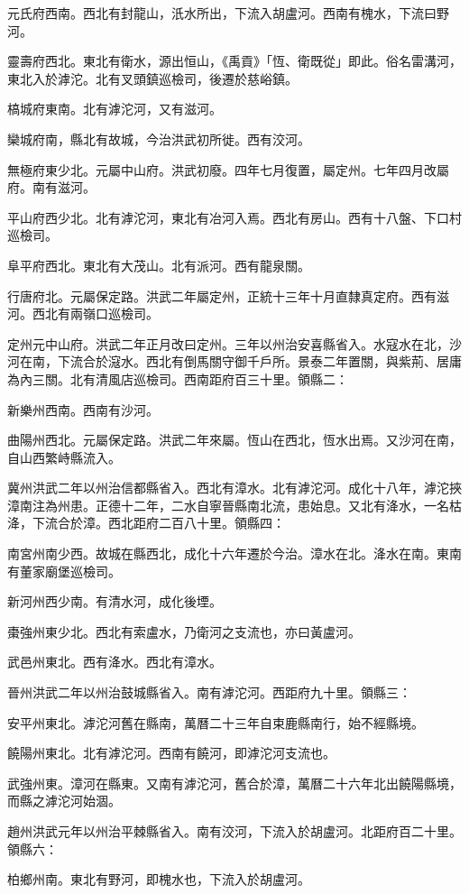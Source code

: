 元氏府西南。西北有封龍山，汦水所出，下流入胡盧河。西南有槐水，下流曰野河。

靈壽府西北。東北有衛水，源出恒山，《禹貢》「恆、衛既從」即此。俗名雷溝河，東北入於滹沱。北有叉頭鎮巡檢司，後遷於慈峪鎮。

槁城府東南。北有滹沱河，又有滋河。

欒城府南，縣北有故城，今治洪武初所徙。西有洨河。

無極府東少北。元屬中山府。洪武初廢。四年七月復置，屬定州。七年四月改屬府。南有滋河。

平山府西少北。北有滹沱河，東北有冶河入焉。西北有房山。西有十八盤、下口村巡檢司。

阜平府西北。東北有大茂山。北有派河。西有龍泉關。

行唐府北。元屬保定路。洪武二年屬定州，正統十三年十月直隸真定府。西有滋河。西北有兩嶺口巡檢司。

定州元中山府。洪武二年正月改曰定州。三年以州治安喜縣省入。水寇水在北，沙河在南，下流合於滱水。西北有倒馬關守御千戶所。景泰二年置關，與紫荊、居庸為內三關。北有清風店巡檢司。西南距府百三十里。領縣二：

新樂州西南。西南有沙河。

曲陽州西北。元屬保定路。洪武二年來屬。恆山在西北，恆水出焉。又沙河在南，自山西繁峙縣流入。

冀州洪武二年以州治信都縣省入。西北有漳水。北有滹沱河。成化十八年，滹沱挾漳南注為州患。正德十二年，二水自寧晉縣南北流，患始息。又北有洚水，一名枯洚，下流合於漳。西北距府二百八十里。領縣四：

南宮州南少西。故城在縣西北，成化十六年遷於今治。漳水在北。洚水在南。東南有董家廟堡巡檢司。

新河州西少南。有清水河，成化後堙。

棗強州東少北。西北有索盧水，乃衛河之支流也，亦曰黃盧河。

武邑州東北。西有洚水。西北有漳水。

晉州洪武二年以州治鼓城縣省入。南有滹沱河。西距府九十里。領縣三：

安平州東北。滹沱河舊在縣南，萬曆二十三年自束鹿縣南行，始不經縣境。

饒陽州東北。北有滹沱河。西南有饒河，即滹沱河支流也。

武強州東。漳河在縣東。又南有滹沱河，舊合於漳，萬曆二十六年北出饒陽縣境，而縣之滹沱河始涸。

趙州洪武元年以州治平棘縣省入。南有洨河，下流入於胡盧河。北距府百二十里。領縣六：

柏鄉州南。東北有野河，即槐水也，下流入於胡盧河。

